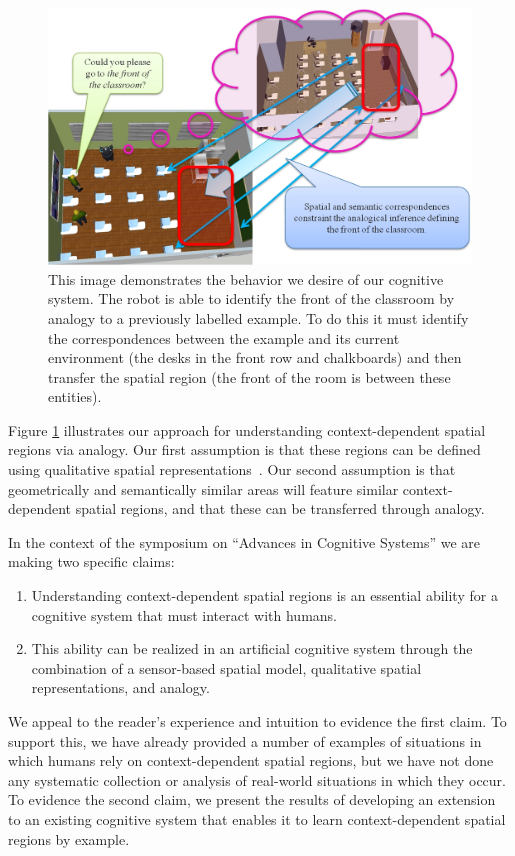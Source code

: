 \documentclass[letterpaper]{article}
\begin{document}
\begin{figure}[t!]
  \includegraphics[width=\textwidth]{example1.jpg}
  \caption{
This image demonstrates the behavior we desire of our cognitive system. The robot is able to identify the front of the classroom by analogy to a previously labelled example. To do this it must identify the correspondences between the example and its current environment (the desks in the front row and chalkboards) and then transfer the spatial region (the front of the room is between these entities).}
  \label{fig:example}
\end{figure}

Figure \ref{fig:example} illustrates our approach for understanding context-dependent spatial regions via analogy. Our first assumption is that these regions can be defined using qualitative spatial representations~\cite{Cohn:2001}. Our second assumption is that geometrically and semantically similar areas will feature similar context-dependent spatial regions, and that these can be transferred through analogy. 

In the context of the symposium on ``Advances in Cognitive Systems'' we are making two specific claims:

\begin{enumerate}
\item Understanding context-dependent spatial regions is an essential ability for a cognitive system that must interact with humans.
\item This ability can be realized in an artificial cognitive system through the combination of a sensor-based spatial model, qualitative spatial representations, and analogy.  
\end{enumerate}

\noindent We appeal to the reader's experience and intuition to evidence the first claim. To support this, we have already provided a number of examples of situations in which humans rely on context-dependent spatial regions, but we have not done any systematic collection or analysis of real-world situations in which they occur. To evidence the second claim, we present the results of developing an extension to an existing cognitive system that enables it to learn context-dependent spatial regions by example. 
\end{document}
